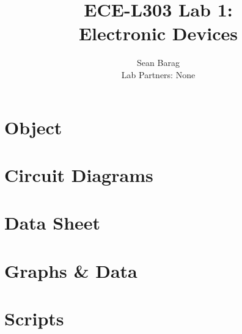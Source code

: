\documentclass{article}
\title{ECE-L303 Lab 1: \\ Electronic Devices}
\author{Sean Barag \\ Lab Partners: None}
\date{}
\begin{document}


\thispagestyle{empty}
\newpage
\mbox{}

\maketitle
\setcounter{page}{1} %
\tableofcontents %

\newpage %
\section{Object}


\section{Circuit Diagrams}


\section{Data Sheet}


\section{Graphs \& Data}


\newpage
\appendix
\section{Scripts}
\end{document}
